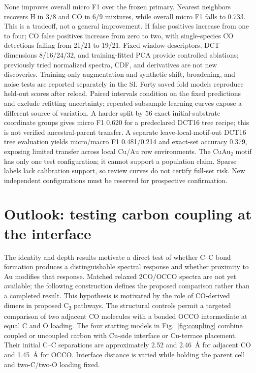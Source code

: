 \documentclass[11pt,a4paper]{article}
\begin{document}


None improves overall micro F1 over the frozen primary. Nearest neighbors recovers H in 3/8 and CO in 6/9 mixtures, while overall micro F1 falls to 0.733. This is a tradeoff, not a general improvement. H false positives increase from one to four; CO false positives increase from zero to two, with single-species CO detections falling from 21/21 to 19/21. Fixed-window descriptors, DCT dimensions 8/16/24/32, and training-fitted PCA provide controlled ablations; previously tried normalized spectra, CDF, and derivatives are not new discoveries. Training-only augmentation and synthetic shift, broadening, and noise tests are reported separately in the SI. Forty saved fold models reproduce held-out scores after reload. Paired intervals condition on the fixed predictions and exclude refitting uncertainty; repeated subsample learning curves expose a different source of variation. A harder split by 56 exact initial-substrate coordinate groups gives micro F1 0.620 for a predeclared DCT16 tree recipe; this is not verified ancestral-parent transfer. A separate leave-local-motif-out DCT16 tree evaluation yields micro/macro F1 0.481/0.214 and exact-set accuracy 0.379, exposing limited transfer across local Cu/Au row environments. The CuAu$_2$ motif has only one test configuration; it cannot support a population claim. Sparse labels lack calibration support, so review curves do not certify full-set risk. New independent configurations must be reserved for prospective confirmation.

\section{Outlook: testing carbon coupling at the interface}\label{sec:outlook}
The identity and depth results motivate a direct test of whether C--C bond formation produces a distinguishable spectral response and whether proximity to Au modifies that response. Matched relaxed 2CO/OCCO spectra are not yet available; the following construction defines the proposed comparison rather than a completed result. This hypothesis is motivated by the role of CO-derived dimers in proposed C\textsubscript{2} pathways.\cite{zhan2024,montoya2015} The structural controls permit a targeted comparison of two adjacent CO molecules with a bonded OCCO intermediate at equal C and O loading. The four starting models in Fig.~\ref{fig:coupling} combine coupled or uncoupled carbon with Cu-side interface or Cu-terrace placement. Their initial C--C separations are approximately 2.52 and 2.46~\AA{} for adjacent CO and 1.45~\AA{} for OCCO. Interface distance is varied while holding the parent cell and two-C/two-O loading fixed.
\end{document}
